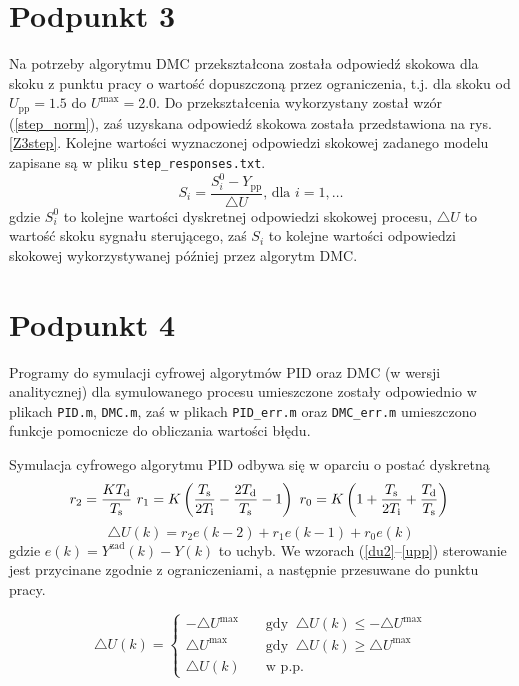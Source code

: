\chapter{Podpunkt 3}
Na potrzeby algorytmu DMC przekształcona została odpowiedź skokowa dla skoku z punktu pracy o wartość dopuszczoną przez ograniczenia, t.j. dla skoku od $U_{\mathrm{pp}}=\num{1,5}$ do $U^{\mathrm{max}}=\num{2,0}$. Do przekształcenia wykorzystany został wzór (\ref{step_norm}), zaś uzyskana odpowiedź skokowa została przedstawiona na rys. \ref{Z3step}. Kolejne wartości wyznaczonej odpowiedzi skokowej zadanego modelu zapisane są w pliku \verb+step_responses.txt+.
\begin{equation}
S_i = \frac{S_i^0 - Y_{\mathrm{pp}}}{\triangle U} \textrm{, dla } i=1,\ldots
\label{step_norm}
\end{equation}
gdzie $S_i^0$ to kolejne wartości dyskretnej odpowiedzi skokowej procesu, $\triangle U$ to wartość skoku sygnału sterującego, zaś $S_i$ to kolejne wartości odpowiedzi skokowej wykorzystywanej później przez algorytm DMC.


\chapter{Podpunkt 4}
Programy do symulacji cyfrowej algorytmów PID oraz DMC (w wersji analitycznej) dla symulowanego procesu umieszczone zostały odpowiednio w plikach \verb+PID.m+, \verb+DMC.m+, zaś w plikach \verb+PID_err.m+ oraz \verb+DMC_err.m+ umieszczono funkcje pomocnicze do obliczania wartości błędu.

Symulacja cyfrowego algorytmu PID odbywa się w oparciu o postać dyskretną
\begin{equation}
r_2 = \frac{K T_{\mathrm{d}}}{T_{\mathrm{s}}} \
r_1 = K \left( \frac{T_{\mathrm{s}}}{2 T_{\mathrm{i}}} - \frac{2 T_{\mathrm{d}}}{T_{\mathrm{s}}} - 1 \right) \
r_0 = K \left( 1 + \frac{T_{\mathrm{s}}}{2 T_{\mathrm{i}}} + \frac{T_{\mathrm{d}}}{T_{\mathrm{s}}} \right) \\
\label{r_t}
\end{equation}
\begin{equation}
\triangle U(k) = r_2 e(k-2) + r_1 e(k-1) + r_0 e(k)
\label{du}
\end{equation}
gdzie $e(k)=Y^{\mathrm{zad}}(k) - Y(k)$ to uchyb. We wzorach (\ref{du2}--\ref{upp}) sterowanie jest przycinane zgodnie z ograniczeniami, a następnie przesuwane do punktu pracy.

\begin{equation}
\triangle U(k) = 
\begin{cases}
-\triangle U^{\mathrm{max}} &\quad \textrm{gdy } \ \triangle U(k) \le -\triangle U^{\mathrm{max}} \\
\triangle U^{\mathrm{max}} &\quad \textrm{gdy } \ \triangle U(k) \ge \triangle U^{\mathrm{max}}  \\
\triangle U(k) &\quad \textrm{w p.p.}
\end{cases}
\label{du2}
\end{equation}

